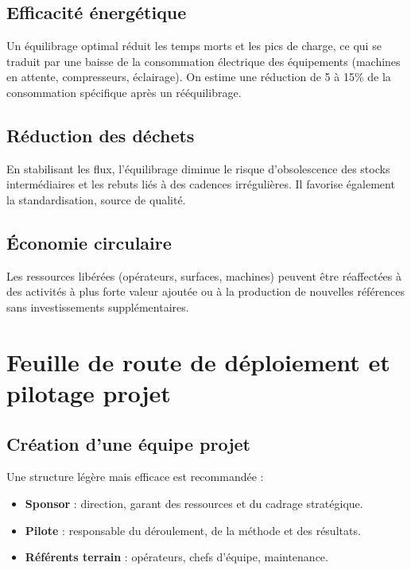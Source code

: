 \documentclass[12pt,a4paper]{article}
\begin{document}
\begin{center}
\subsection{Efficacité énergétique}
Un équilibrage optimal réduit les temps morts et les pics de charge, ce qui se traduit par une baisse de la consommation électrique des équipements (machines en attente, compresseurs, éclairage). On estime une réduction de 5 à 15\% de la consommation spécifique après un rééquilibrage.

\subsection{Réduction des déchets}
En stabilisant les flux, l’équilibrage diminue le risque d’obsolescence des stocks intermédiaires et les rebuts liés à des cadences irrégulières. Il favorise également la standardisation, source de qualité.

\subsection{Économie circulaire}
Les ressources libérées (opérateurs, surfaces, machines) peuvent être réaffectées à des activités à plus forte valeur ajoutée ou à la production de nouvelles références sans investissements supplémentaires.

\section{Feuille de route de déploiement et pilotage projet}

\subsection{Création d’une équipe projet}
Une structure légère mais efficace est recommandée :
\begin{itemize}
    \item \textbf{Sponsor} : direction, garant des ressources et du cadrage stratégique.
    \item \textbf{Pilote} : responsable du déroulement, de la méthode et des résultats.
    \item \textbf{Référents terrain} : opérateurs, chefs d’équipe, maintenance.
\end{itemize}


\end{center}
\end{document}
